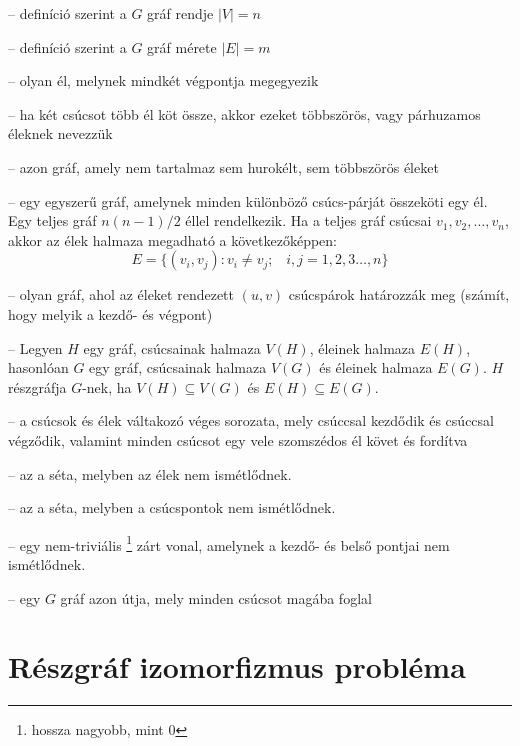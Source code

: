 \begin{description}
	\setlength{\itemsep}{0.04mm}
	\item[rend] -- definíció szerint a \(G\) gráf rendje \(|V| = n\)
	\item[méret] -- definíció szerint a \(G\) gráf mérete \(|E| = m\)
	\item[hurokél] -- olyan él, melynek mindkét végpontja megegyezik
	\item[többszörös él] -- ha két csúcsot több él köt össze, akkor ezeket többszörös, vagy párhuzamos éleknek nevezzük
	\item[egyszerű gráf] -- azon gráf, amely nem tartalmaz sem hurokélt, sem többszörös éleket
	\item[teljes gráf] -- egy egyszerű gráf, amelynek minden különböző csúcs-párját összeköti egy él. Egy teljes gráf \(n(n-1)/2\) éllel rendelkezik. Ha a teljes gráf csúcsai \(v_1, v_2, \ldots, v_n\), akkor az élek halmaza megadható a következőképpen:
	\begin{equation}
	E = \{(v_i,v_j): v_i \neq v_j;\;\;\;i,j = 1,2,3\dots, n\}
	\end{equation}
	\item[irányított gráf] -- olyan gráf, ahol az éleket rendezett \((u,v)\) csúcspárok határozzák meg (számít, hogy melyik a kezdő- és végpont)
	\item[részgráf] -- Legyen \(H\) egy gráf, csúcsainak halmaza \(V(H)\), éleinek halmaza \(E(H)\), hasonlóan \(G\) egy gráf, csúcsainak halmaza \(V(G)\) és éleinek halmaza \(E(G)\). \(H\) részgráfja \(G\)-nek, ha \(V(H) \subseteq V(G)\) és \(E(H) \subseteq E(G)\).
	\item[séta] -- a csúcsok és élek váltakozó véges sorozata, mely csúccsal kezdődik és csúccsal végződik, valamint minden csúcsot egy vele szomszédos él követ és fordítva
	\item[vonal] -- az a séta, melyben az élek nem ismétlődnek.
	\item[út] -- az a séta, melyben a csúcspontok nem ismétlődnek.
	\item[kör] -- egy nem-triviális%
	\footnote{ %
		hossza nagyobb, mint 0
	}  %
 zárt vonal, amelynek a kezdő- és belső pontjai nem ismétlődnek.
	\item[Hamilton-út] -- egy \(G\) gráf azon útja, mely minden csúcsot magába foglal
\end{description}

\section{Részgráf izomorfizmus probléma}\label{sec:ALAP:adatelem}

